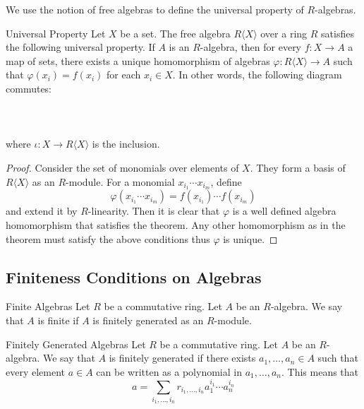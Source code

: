 \documentclass[a4paper]{article}
\begin{document}
We use the notion of free algebras to define the universal property of $R$-algebras. 

\begin{prp}{Universal Property}{} Let $X$ be a set. The free algebra $R\langle X\rangle$ over a ring $R$ satisfies the following universal property. If $A$ is an $R$-algebra, then for every $f:X\to A$ a map of sets, there exists a unique homomorphism of algebras $\varphi:R\langle X\rangle\to A$ such that $\varphi(x_i)=f(x_i)$ for each $x_i\in X$. In other words, the following diagram commutes: \\~\\
\\~\\
where $\iota:X\to R\langle X\rangle$ is the inclusion. \tcbline
\begin{proof}
Consider the set of monomials over elements of $X$. They form a basis of $R\langle X\rangle$ as an $R$-module. For a monomial $x_{i_1}\cdots x_{i_m}$, define $$\varphi(x_{i_1}\cdots x_{i_m})=f(x_{i_1})\cdots f(x_{i_m})$$ and extend it by $R$-linearity. Then it is clear that $\varphi$ is a well defined algebra homomorphism that satisfies the theorem. Any other homomorphism as in the theorem must satisfy the above conditions thus $\varphi$ is unique. 
\end{proof}
\end{prp}

\subsection{Finiteness Conditions on Algebras}
\begin{defn}{Finite Algebras}{} Let $R$ be a commutative ring. Let $A$ be an $R$-algebra. We say that $A$ is finite if $A$ is finitely generated as an $R$-module. 
\end{defn}

\begin{defn}{Finitely Generated Algebras}{} Let $R$ be a commutative ring. Let $A$ be an $R$-algebra. We say that $A$ is finitely generated if there exists $a_1,\dots,a_n\in A$ such that every element $a\in A$ can be written as a polynomial in $a_1,\dots,a_n$. This means that $$a=\sum_{i_1,\dots,i_n}r_{i_1,\dots,i_n}a_1^{i_1}\cdots a_n^{i_n}$$
\end{defn}
\end{document}
